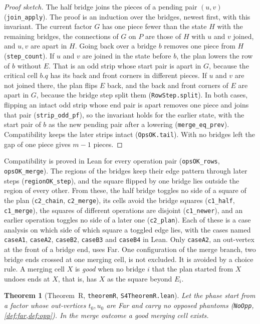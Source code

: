 \documentclass[11pt]{article}
\theoremstyle{plain}
\newtheorem{theorem}{Theorem}[section]
\theoremstyle{definition}
\theoremstyle{remark}
\newcommand{\lean}[1]{\texttt{#1}}
\begin{document}
\begin{proof}[Proof sketch]
The half bridge joins the pieces of a pending pair $(u,v)$ (\lean{join\_apply}).
The proof is an induction over the bridges, newest first, with this invariant.
The current factor $G$ has one piece fewer than the state $H$ with the remaining bridges, the
connections of $G$ on $P$ are those of $H$ with $u$ and $v$ joined, and $u,v$ are apart in $H$.
Going back over a bridge $b$ removes one piece from $H$ (\lean{step\_count}).
If $u$ and $v$ are joined in the state before $b$, the plan lowers the row of $b$ without $E$.
That is an odd strip whose start pair is apart in $G$, because the critical cell $b.q$ has its back
and front corners in different pieces.
If $u$ and $v$ are not joined there, the plan flips $E$ back, and the back and front corners of $E$
are apart in $G$, because the bridge step split them (\lean{RowStep.split}).
In both cases, flipping an intact odd strip whose end pair is apart removes one piece and joins
that pair (\lean{strip\_odd\_pf}), so the invariant holds for the earlier state, with the start pair
of $b$ as the new pending pair after a lowering (\lean{merge\_eq\_prev}).
Compatibility keeps the later strips intact (\lean{OpsOK.tail}).
With no bridges left the gap of one piece gives $m-1$ pieces.
\end{proof}

Compatibility is proved in Lean for every operation pair (\lean{opsOK\_rows},
\lean{opsOK\_merge}).
The regions of the bridges keep their edge pattern through later steps (\lean{regionOK\_step}), and
the square flipped by one bridge lies outside the region of every other.
From these, the half bridge toggles no side of a square of the plan (\lean{c2\_chain},
\lean{c2\_merge}), its cells avoid the bridge squares (\lean{c1\_half}, \lean{c1\_merge}), the
squares of different operations are disjoint (\lean{c1\_newer}), and an earlier operation toggles no
side of a later one (\lean{c2\_plan}).
Each of these is a case analysis on which side of which square a toggled edge lies, with the cases
named \lean{caseA1}, \lean{caseA2}, \lean{caseB2}, \lean{caseB3} and \lean{caseB4} in Lean.
Only \lean{caseA2}, an out-vertex at the front of a bridge end, uses Far.
One configuration of the merge branch, two bridge ends crossed at one merging cell, is not
excluded.
It is avoided by a choice rule.
A merging cell $X$ is \emph{good} when no bridge $i$ that the plan started from $X$ undoes ends at
$X$, that is, has $X$ as the square beyond $E_i$.
\begin{theorem}[Theorem~R, \lean{theoremR}, \lean{S4TheoremR.lean}]
\label{thm:R}
Let the phase start from a factor whose out-vertices $t_0,u_0$ are Far and carry no opposed
phantoms (\lean{NoOpp}, \cref{def:far,def:opp}).
In the merge outcome a good merging cell exists.
\end{theorem}
\end{document}
